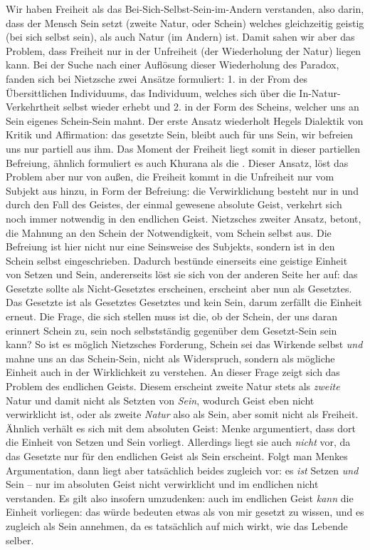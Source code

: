 \documentclass[12pt, a4paper, openany]{report}
\begin{document}
Wir haben Freiheit als das Bei-Sich-Selbst-Sein-im-Andern verstanden, also darin, dass der Mensch Sein setzt (zweite Natur, oder Schein) welches gleichzeitig geistig (bei sich selbst sein), als auch Natur (im Andern) ist.
Damit sahen wir aber das Problem, dass Freiheit nur in der Unfreiheit (der Wiederholung der Natur) liegen kann.
Bei der Suche nach einer Auflösung dieser Wiederholung des Paradox, fanden sich bei Nietzsche zwei Ansätze formuliert:
1. in der From des Übersittlichen Individuums, das Individuum, welches sich über die In-Natur-Verkehrtheit selbst wieder erhebt
und 2. in der Form des Scheins, welcher uns an Sein eigenes Schein-Sein mahnt.
Der erste Ansatz wiederholt Hegels Dialektik von Kritik und Affirmation: 
das gesetzte Sein, bleibt auch für uns Sein, wir befreien uns nur partiell aus ihm.
Das Moment der Freiheit liegt somit in dieser partiellen Befreiung, ähnlich formuliert es auch Khurana als die .
Dieser Ansatz, löst das Problem aber nur von außen, die Freiheit kommt in die Unfreiheit nur vom Subjekt aus hinzu, in Form der Befreiung:
die Verwirklichung besteht nur in und durch den Fall des Geistes, der einmal gewesene absolute Geist, verkehrt sich noch immer notwendig in den endlichen Geist.
Nietzsches zweiter Ansatz, betont, die Mahnung an den Schein der Notwendigkeit, vom Schein selbst aus.
Die Befreiung ist hier nicht nur eine Seinsweise des Subjekts, sondern ist in den Schein selbst eingeschrieben.
Dadurch bestünde einerseits eine geistige Einheit von Setzen und Sein, andererseits löst sie sich von der anderen Seite her auf: 
das Gesetzte sollte als Nicht-Gesetztes erscheinen, erscheint aber nun als Gesetztes.
Das Gesetzte ist als Gesetztes Gesetztes und kein Sein, darum zerfällt die Einheit erneut.
Die Frage, die sich stellen muss ist die, ob der Schein, der uns daran erinnert Schein zu, sein noch selbstständig gegenüber dem Gesetzt-Sein sein kann?  So ist es möglich Nietzsches Forderung, Schein sei das Wirkende selbst \emph{und} mahne uns an das Schein-Sein, nicht als Widerspruch, sondern als mögliche Einheit auch in der Wirklichkeit zu verstehen.
An dieser Frage zeigt sich das Problem des endlichen Geists. 
Diesem erscheint zweite Natur stets als \emph{zweite} Natur und damit nicht als Setzten von \emph{Sein}, wodurch Geist eben nicht verwirklicht ist, oder als zweite \emph{Natur} also als Sein, aber somit nicht als Freiheit. 
Ähnlich verhält es sich mit dem absoluten Geist: 
Menke argumentiert, dass dort die Einheit von Setzen und Sein vorliegt.
Allerdings liegt sie auch \emph{nicht} vor, da das Gesetzte nur für den endlichen Geist als Sein erscheint.
Folgt man Menkes Argumentation, dann liegt aber tatsächlich beides zugleich vor: 
es \emph{ist} Setzen \emph{und} Sein -- nur im absoluten Geist nicht verwirklicht und im endlichen nicht verstanden.
Es gilt also insofern umzudenken: auch im endlichen Geist \emph{kann} die Einheit vorliegen: 
das würde bedeuten etwas als von mir gesetzt zu wissen, und es zugleich als Sein annehmen, da es tatsächlich auf mich wirkt, wie das Lebende selber.\\
\end{document}
